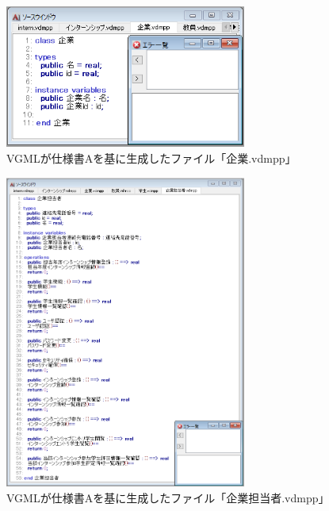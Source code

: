 \begin{figure}[tp]
    \begin{center}
    \includegraphics[width=300]{image/indication_vdm4.PNG}
    \caption{VGMLが仕様書Aを基に生成したファイル「企業.vdmpp」}
    \label{fig:indication_vdm4}
    \end{center}
\end{figure}

\begin{figure}[tp]
    \begin{center}
    \includegraphics[width=300]{image/indication_vdm5.PNG}
    \caption{VGMLが仕様書Aを基に生成したファイル「企業担当者.vdmpp」}
    \label{fig:indication_vdm5}
    \end{center}
\end{figure}

